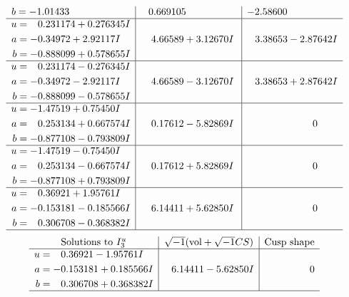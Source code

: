 \documentclass[1p]{elsarticle_modified}
\theoremstyle{definition}
\newcommand{\I}{\sqrt{-1}}
\begin{document}
$$\begin{array}{c|c|c}
\begin{aligned}
b &= -1.01433\phantom{ +0.000000I}\end{aligned}
 & \phantom{-}0.669105\phantom{ +0.000000I} & -2.58600\phantom{ +0.000000I} \\ \hline\begin{aligned}
u &= \phantom{-}0.231174 + 0.276345 I \\
a &= -0.34972 + 2.92117 I \\
b &= -0.888099 + 0.578655 I\end{aligned}
 & \phantom{-}4.66589 + 3.12670 I & \phantom{-}3.38653 - 2.87642 I \\ \hline\begin{aligned}
u &= \phantom{-}0.231174 - 0.276345 I \\
a &= -0.34972 - 2.92117 I \\
b &= -0.888099 - 0.578655 I\end{aligned}
 & \phantom{-}4.66589 - 3.12670 I & \phantom{-}3.38653 + 2.87642 I \\ \hline\begin{aligned}
u &= -1.47519 + 0.75450 I \\
a &= \phantom{-}0.253134 + 0.667574 I \\
b &= -0.877108 - 0.793809 I\end{aligned}
 & \phantom{-}0.17612 - 5.82869 I & \phantom{-0.000000 } 0 \\ \hline\begin{aligned}
u &= -1.47519 - 0.75450 I \\
a &= \phantom{-}0.253134 - 0.667574 I \\
b &= -0.877108 + 0.793809 I\end{aligned}
 & \phantom{-}0.17612 + 5.82869 I & \phantom{-0.000000 } 0 \\ \hline\begin{aligned}
u &= \phantom{-}0.36921 + 1.95761 I \\
a &= -0.153181 - 0.185566 I \\
b &= \phantom{-}0.306708 - 0.368382 I\end{aligned}
 & \phantom{-}6.14411 + 5.62850 I & \phantom{-0.000000 } 0\\
 \hline 
 \end{array}$$\newpage$$\begin{array}{c|c|c}  
\text{Solutions to }I^u_{3}& \I (\text{vol} + \sqrt{-1}CS) & \text{Cusp shape}\\
 \hline 
\begin{aligned}
u &= \phantom{-}0.36921 - 1.95761 I \\
a &= -0.153181 + 0.185566 I \\
b &= \phantom{-}0.306708 + 0.368382 I\end{aligned}
 & \phantom{-}6.14411 - 5.62850 I & \phantom{-0.000000 } 0\\
 \hline 
 \end{array}$$\newpage\newpage\renewcommand{\arraystretch}{1}
\end{document}
